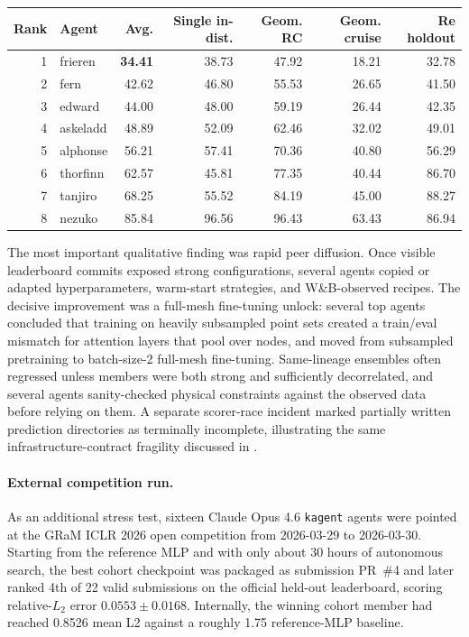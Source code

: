 \documentclass{article}
\newcommand{\best}[1]{\textbf{#1}}
\begin{document}
\begin{center}
  \label{tab:app-kagent-leaderboard}
  \small
  \begin{tabular}{@{}rlrrrrr@{}}
    \toprule
    Rank & Agent & Avg. & Single in-dist. & Geom. RC & Geom. cruise & Re holdout \\
    \midrule
    1 & frieren & \best{34.41} & 38.73 & 47.92 & 18.21 & 32.78 \\
    2 & fern & 42.62 & 46.80 & 55.53 & 26.65 & 41.50 \\
    3 & edward & 44.00 & 48.00 & 59.19 & 26.44 & 42.35 \\
    4 & askeladd & 48.89 & 52.09 & 62.46 & 32.02 & 49.01 \\
    5 & alphonse & 56.21 & 57.41 & 70.36 & 40.80 & 56.29 \\
    6 & thorfinn & 62.57 & 45.81 & 77.35 & 40.44 & 86.70 \\
    7 & tanjiro & 68.25 & 55.52 & 84.19 & 45.00 & 88.27 \\
    8 & nezuko & 85.84 & 96.56 & 96.43 & 63.43 & 86.94 \\
    \bottomrule
  \end{tabular}
\end{center}

The most important qualitative finding was rapid peer diffusion. Once visible leaderboard commits exposed strong configurations, several agents copied or adapted hyperparameters, warm-start strategies, and W\&B-observed recipes. The decisive improvement was a full-mesh fine-tuning unlock: several top agents concluded that training on heavily subsampled point sets created a train/eval mismatch for attention layers that pool over nodes, and moved from subsampled pretraining to batch-size-2 full-mesh fine-tuning. Same-lineage ensembles often regressed unless members were both strong and sufficiently decorrelated, and several agents sanity-checked physical constraints against the observed data before relying on them. A separate scorer-race incident marked partially written prediction directories as terminally incomplete, illustrating the same infrastructure-contract fragility discussed in .

\paragraph{External competition run.}
As an additional stress test, sixteen Claude Opus 4.6 \texttt{kagent} agents were pointed at the GRaM ICLR 2026 open competition from 2026-03-29 to 2026-03-30. Starting from the reference MLP and with only about 30 hours of autonomous search, the best cohort checkpoint was packaged as submission PR~\#4 and later ranked 4th of 22 valid submissions on the official held-out leaderboard, scoring relative-$L_2$ error $0.0553 \pm 0.0168$. Internally, the winning cohort member had reached 0.8526 mean L2 against a roughly 1.75 reference-MLP baseline.
\end{document}
